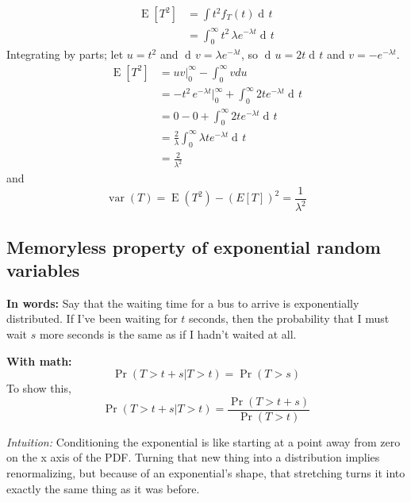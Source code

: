 \documentclass[11pt]{article}
\DeclareMathOperator{\dif}{d\!}
\DeclareMathOperator{\E}{E}
\DeclareMathOperator{\var}{var}
\begin{document}
\begin{equation}
\begin{split}
\E[T^2] &= \int t^2 f_T(t) \dif t \\
   &= \int_0^{\infty} t^2 \, \lambda e^{-\lambda t} \dif t
\end{split}
\end{equation}
Integrating by parts; let $u=t^2$ and $\dif v = \lambda e^{-\lambda t}$, 
    so $\dif u= 2 t \dif t$ and $v = -e^{-\lambda t}$.
\begin{equation}
\begin{split}
\E[T^2] &= u v \rvert_0^{\infty} - \int_0^{\infty} v du \\
   &= -t^2 \, e^{-\lambda t} \rvert_0^{\infty} + \int_0^{\infty} 2 t e^{-\lambda t} \dif t \\
   &= 0 - 0 +  \int_0^{\infty} 2 t e^{-\lambda t} \dif t\\
   &= \frac{2}{\lambda} \int_0^{\infty} \lambda t e^{-\lambda t} \dif t\\
   &= \frac{2}{\lambda^2}
\end{split}
\end{equation}
and
\begin{equation}
\var(T) = \E(T^2) - \left(E[T]\right)^2 = \frac{1}{\lambda^2}
\end{equation}

\subsection{Memoryless property of exponential random variables}

{\bf In words:} Say that the waiting time for a bus to arrive is exponentially distributed. If I've been waiting
for $t$ seconds, then the probability that I must wait $s$ more seconds is the same as if I hadn't waited
at all.

{\bf With math:}
\begin{equation}
\Pr\left(T > t + s \vert T > t\right) = \Pr\left(T > s\right)
\end{equation}
To show this,
\begin{equation}
\Pr\left(T > t + s \vert T > t\right) = \frac{\Pr\left(T > t + s\right)}{\Pr\left(T > t\right)}
\end{equation}

{\it Intuition:} Conditioning the exponential is like starting at a point away from zero on the
x axis of the PDF. Turning that new thing into a distribution implies renormalizing, but because 
of an exponential's shape, that stretching turns it into exactly the same thing as it was before.
\end{document}
